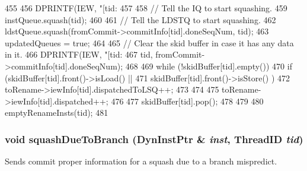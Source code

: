 \begin{DoxyCode}
455 {
456     DPRINTF(IEW, "[tid:%
457 
458     // Tell the IQ to start squashing.
459     instQueue.squash(tid);
460 
461     // Tell the LDSTQ to start squashing.
462     ldstQueue.squash(fromCommit->commitInfo[tid].doneSeqNum, tid);
463     updatedQueues = true;
464 
465     // Clear the skid buffer in case it has any data in it.
466     DPRINTF(IEW, "[tid:%
467             tid, fromCommit->commitInfo[tid].doneSeqNum);
468 
469     while (!skidBuffer[tid].empty()) {
470         if (skidBuffer[tid].front()->isLoad() ||
471             skidBuffer[tid].front()->isStore() ) {
472             toRename->iewInfo[tid].dispatchedToLSQ++;
473         }
474 
475         toRename->iewInfo[tid].dispatched++;
476 
477         skidBuffer[tid].pop();
478     }
479 
480     emptyRenameInsts(tid);
481 }
\end{DoxyCode}
\hypertarget{classDefaultIEW_a7312a115c34dfbb21d18b6d85fc46fb9}{
\subsubsection[{squashDueToBranch}]{\setlength{\rightskip}{0pt plus 5cm}void squashDueToBranch ({\bf DynInstPtr} \& {\em inst}, \/  {\bf ThreadID} {\em tid})}}
\label{classDefaultIEW_a7312a115c34dfbb21d18b6d85fc46fb9}
Sends commit proper information for a squash due to a branch mispredict. 


